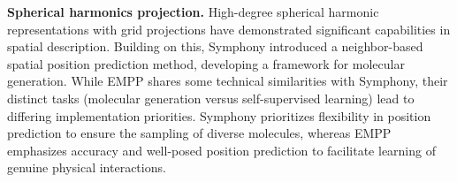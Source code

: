 \textbf{Spherical harmonics projection.} High-degree spherical harmonic representations with grid projections \citep{liao2023equiformer,passaro2023reducing} have demonstrated significant capabilities in spatial description. Building on this, Symphony \citep{daigavane2024symphony} introduced a neighbor-based spatial position prediction method, developing a framework for molecular generation. While EMPP shares some technical similarities with Symphony, their distinct tasks (molecular generation versus self-supervised learning) lead to differing implementation priorities. Symphony prioritizes flexibility in position prediction to ensure the sampling of diverse molecules, whereas EMPP emphasizes accuracy and well-posed position prediction to facilitate learning of genuine physical interactions.



\vspace{-1em}